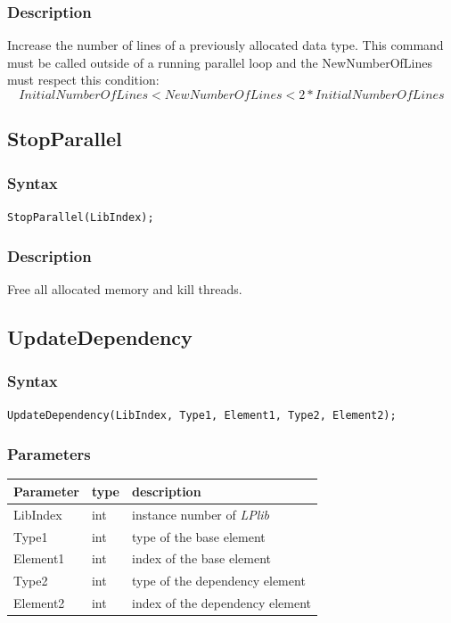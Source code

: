 \documentclass[a4paper,12pt]{article}
\begin{document}
\subsubsection*{Description}
Increase the number of lines of a previously allocated data type. This command must be called outside of a running parallel loop and the NewNumberOfLines must respect this condition: $$ InitialNumberOfLines < NewNumberOfLines < 2*InitialNumberOfLines $$


\subsection{StopParallel}

\subsubsection*{Syntax}
\tt{StopParallel(LibIndex);}
\normalfont

\subsubsection*{Description}
Free all allocated memory and kill threads.


\subsection{UpdateDependency}

\subsubsection*{Syntax}
\tt{UpdateDependency(LibIndex, Type1, Element1, Type2, Element2);}
\normalfont

\subsubsection*{Parameters}

\begin{tabular}{|m{2cm}|m{1.5cm}|m{10.5cm}|}
\hline
Parameter  & type   & description \\
\hline
LibIndex   & int    & instance number of \emph{LPlib} \\
\hline
Type1      & int    & type of the base element \\
\hline
Element1   & int    & index of the base element \\
\hline
Type2      & int    & type of the dependency element \\
\hline
Element2   & int    & index of the dependency element \\
\hline
\end{tabular}
\end{document}
